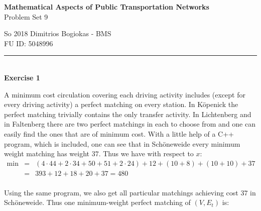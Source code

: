 \documentclass[12pt]{article}
\newenvironment{a_enum}{\begin{enumerate}[label=(\alph{*})]}{\end{enumerate}} %
\newcommand\HRule{\rule{\linewidth}{0.1mm}}
\begin{document}
\begin{center}
{\bf Mathematical Aspects of Public Transportation Networks}\\
Problem Set 9
\end{center}
So 2018 \hfill Dimitrios Bogiokas - BMS\\
\phantom{X}\hfill FU ID: 5048996\\
\HRule\\
{\bf Exercise 1} \begin{a_enum} \item A minimum cost circulation covering each driving activity includes (except for every driving activity) a perfect matching on every station. In K\"openick the perfect matching trivially contains the only transfer activity. In Lichtenberg and in Faltenberg there are two perfect matchings in each to choose from and one can easily find the ones that are of minimum cost. With a little help of a C++ program, which is included, one can see that in Sch\"oneweide every minimum weight matching has weight $37$. Thus we have with respect to $x$:
$$\begin{array}{rcl}\min
&=&(4\cdot44+2\cdot34+50+51+2\cdot24)+12+(10+8)+(10+10)+37\\
&=&393+12+18+20+37=480\\
\end{array}$$
\item Using the same program, we also get all particular matchings achieving cost $37$ in Sch\"oneweide. Thus one minimum-weight perfect matching of $(V,E_t)$ is:
\begin{center}
\end{center}
\end{a_enum}
\end{document}
